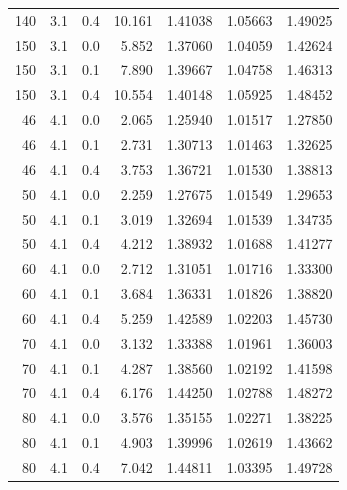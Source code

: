 \begin{longtable}{rrrrrrr}
\num{140} & \num{3.1} & \num{0.4} & \num{10.161} & \num{1.41038} & \num{1.05663} & \num{1.49025}\\
\num{150} & \num{3.1} & \num{0.0} & \num{5.852} & \num{1.37060} & \num{1.04059} & \num{1.42624}\\
\num{150} & \num{3.1} & \num{0.1} & \num{7.890} & \num{1.39667} & \num{1.04758} & \num{1.46313}\\
\num{150} & \num{3.1} & \num{0.4} & \num{10.554} & \num{1.40148} & \num{1.05925} & \num{1.48452}\\
\num{46} & \num{4.1} & \num{0.0} & \num{2.065} & \num{1.25940} & \num{1.01517} & \num{1.27850}\\
\num{46} & \num{4.1} & \num{0.1} & \num{2.731} & \num{1.30713} & \num{1.01463} & \num{1.32625}\\
\num{46} & \num{4.1} & \num{0.4} & \num{3.753} & \num{1.36721} & \num{1.01530} & \num{1.38813}\\
\num{50} & \num{4.1} & \num{0.0} & \num{2.259} & \num{1.27675} & \num{1.01549} & \num{1.29653}\\
\num{50} & \num{4.1} & \num{0.1} & \num{3.019} & \num{1.32694} & \num{1.01539} & \num{1.34735}\\
\num{50} & \num{4.1} & \num{0.4} & \num{4.212} & \num{1.38932} & \num{1.01688} & \num{1.41277}\\
\num{60} & \num{4.1} & \num{0.0} & \num{2.712} & \num{1.31051} & \num{1.01716} & \num{1.33300}\\
\num{60} & \num{4.1} & \num{0.1} & \num{3.684} & \num{1.36331} & \num{1.01826} & \num{1.38820}\\
\num{60} & \num{4.1} & \num{0.4} & \num{5.259} & \num{1.42589} & \num{1.02203} & \num{1.45730}\\
\num{70} & \num{4.1} & \num{0.0} & \num{3.132} & \num{1.33388} & \num{1.01961} & \num{1.36003}\\
\num{70} & \num{4.1} & \num{0.1} & \num{4.287} & \num{1.38560} & \num{1.02192} & \num{1.41598}\\
\num{70} & \num{4.1} & \num{0.4} & \num{6.176} & \num{1.44250} & \num{1.02788} & \num{1.48272}\\
\num{80} & \num{4.1} & \num{0.0} & \num{3.576} & \num{1.35155} & \num{1.02271} & \num{1.38225}\\
\num{80} & \num{4.1} & \num{0.1} & \num{4.903} & \num{1.39996} & \num{1.02619} & \num{1.43662}\\
\num{80} & \num{4.1} & \num{0.4} & \num{7.042} & \num{1.44811} & \num{1.03395} & \num{1.49728}\\

\end{longtable}
